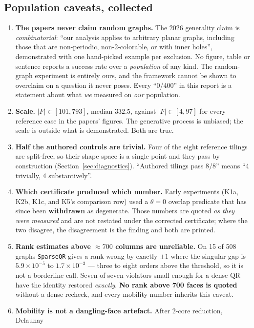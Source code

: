 \documentclass[11pt,a4paper]{article}
\theoremstyle{definition}
\newcommand{\file}[1]{\texttt{\small #1}}
\begin{document}
\subsection{Population caveats, collected}

\begin{enumerate}\itemsep3pt
\item \textbf{The papers never claim random graphs.} The 2026 generality claim is
\emph{combinatorial}: ``our analysis applies to arbitrary planar graphs, including those that
are non-periodic, non-2-colorable, or with inner holes'', demonstrated with one hand-picked
example per exclusion. No figure, table or sentence reports a success rate over a
\emph{population} of any kind. The random-graph experiment is entirely ours, and the framework
cannot be shown to overclaim on a question it never poses. Every ``0/400'' in this report is a
statement about what \emph{we} measured on \emph{our} population.
\item \textbf{Scale.} $|F|\in[101,793]$, median $332.5$, against $|F|\in[4,97]$ for every
reference case in the papers' figures. The generative process is unbiased; the scale is
outside what is demonstrated. Both are true.
\item \textbf{Half the authored controls are trivial.} Four of the eight reference tilings are
split-free, so their shape space is a single point and they pass by construction
(Section~\ref{sec:diagnostics}). ``Authored tilings pass 8/8'' means ``4 trivially, 4
substantively''.
\item \textbf{Which certificate produced which number.} Early experiments (K1a, K2b, K1c, and
K5's comparison row) used a $\theta=0$ overlap predicate that has since been
\textbf{withdrawn} as degenerate. Those numbers are quoted \emph{as they were measured} and are
not restated under the corrected certificate; where the two disagree, the disagreement is the
finding and both are printed.
\item \textbf{Rank estimates above $\approx700$ columns are unreliable.} On 15 of 508 graphs
\file{SparseQR} gives a rank wrong by exactly $\pm1$ where the singular gap is
$5.9\times10^{-5}$ to $1.7\times10^{-3}$ --- three to eight orders above the threshold, so it
is not a borderline call. Seven of seven violators small enough for a dense QR have the
identity restored \emph{exactly}. \textbf{No rank above 700 faces is quoted} without a dense
recheck, and every mobility number inherits this caveat.
\item \textbf{Mobility is not a dangling-face artefact.} After 2-core reduction, Delaunay

\end{enumerate}
\end{document}
